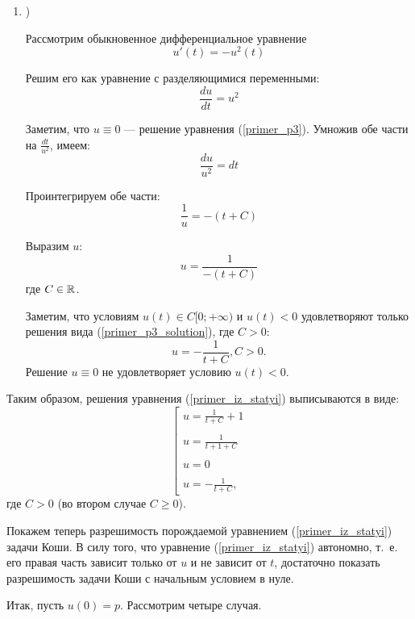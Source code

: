 \begin{enumerate}
\item)

Рассмотрим обыкновенное дифференциальное уравнение
\begin{equation}\label{primer_p3}
	u'(t)=-u^2(t)
\end{equation}

Решим его как уравнение с разделяющимися переменными:
$$
	\frac{du}{dt}=u^2
$$

Заметим, что $u\equiv 0$ --- решение уравнения (\ref{primer_p3}).
Умножив обе части на $\frac{dt}{u^2}$, имеем:
$$
	\frac{du}{u^2}=dt
$$

Проинтегрируем обе части:
$$
	\frac{1}{u}=-(t+C)
$$

Выразим $u$:
\begin{equation}\label{primer_p3_solution}
	u=\frac{1}{-(t+C)}
\end{equation}
где $C\in\mathbb{R}$.

Заметим, что условиям $u(t) \in C[0; +\infty)$ и $u(t) < 0$ удовлетворяют только решения вида (\ref{primer_p3_solution}), где $C>0$:
\begin{equation}
	u=-\frac{1}{t+C}, C>0.
\end{equation}
Решение $u \equiv 0$ не удовлетворяет условию $u(t)<0$.

\end{enumerate}

Таким образом, решения уравнения (\ref{primer_iz_statyi}) выписываются в виде:
\begin{equation}\label{primer_iz_statyi_u_t}
	\left[
		\begin{array}{l}
			u=\frac{1}{t+C}+1
		\\\\
			u=\frac{1}{t+1+C}
		\\\\
			u=0
		\\\\
			u=-\frac{1}{t+C},
		\end{array}
	\right.
\end{equation}
где $C>0$ (во втором случае $C \geq 0$).

Покажем теперь разрешимость порождаемой уравнением (\ref{primer_iz_statyi}) задачи Коши.
В силу того, что уравнение (\ref{primer_iz_statyi}) автономно, т.~е. его правая часть зависит только от $u$ и не зависит от $t$,
достаточно показать разрешимость задачи Коши с начальным условием в нуле.

Итак, пусть $u(0) = p$.
Рассмотрим четыре случая.

